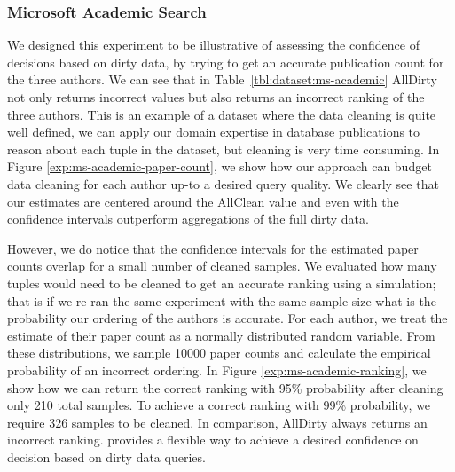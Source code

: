 \subsubsection{Microsoft Academic Search}\label{exp:mas}
We designed this experiment to be illustrative of assessing the confidence of decisions based on dirty data, by trying to get an accurate publication count for the 
three authors.
We can see that in Table~\ref{tbl:dataset:ms-academic} AllDirty not only returns incorrect values but also returns an incorrect ranking of the three authors.
This is an example of a dataset where the data cleaning is quite well defined, we can apply our domain expertise in database publications to reason about each tuple in the dataset, but cleaning is very time consuming. 
In Figure \ref{exp:ms-academic-paper-count}, we show how our approach can budget data cleaning for each author up-to a desired query quality.
We clearly see that our estimates are centered around the AllClean value and even with the confidence intervals outperform aggregations of the full dirty data.

However, we do notice that the confidence intervals for the estimated paper counts overlap for a small number of cleaned samples.
We evaluated how many tuples would need to be cleaned to get an accurate ranking using a simulation; that is if we re-ran the same experiment with the same sample size what is the probability our ordering of the authors is accurate.
For each author, we treat the estimate of their paper count as a normally distributed random variable.
From these distributions, we sample 10000 paper counts and calculate the empirical probability of an incorrect ordering.
In Figure \ref{exp:ms-academic-ranking}, we show how we can return the correct ranking with 95\% probability after cleaning only 210 total samples.
To achieve a correct ranking with 99\% probability, we require 326 samples to be cleaned.
In comparison, AllDirty always returns an incorrect ranking.
\saqpplus provides a flexible way to achieve a desired confidence on decision based on dirty data queries.



